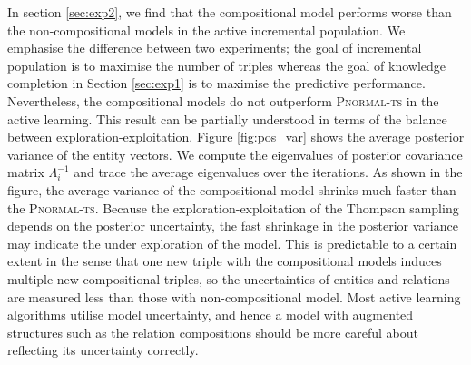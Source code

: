 In section \ref{sec:exp2}, we find that the compositional model performs worse than the non-compositional models in the active incremental population. 
We emphasise the difference between two experiments;
the goal of incremental population is to maximise the number of triples
whereas the goal of knowledge completion in Section \ref{sec:exp1} is to maximise
the predictive performance. Nevertheless, the compositional models do not outperform
\textsc{Pnormal-ts} in the active learning.
This result can be partially understood in terms of the balance between
exploration-exploitation. Figure \ref{fig:pos_var} shows the average posterior variance of
the entity vectors. We compute the eigenvalues of posterior covariance matrix $\Lambda_i^{-1}$
and trace the average eigenvalues over the iterations.
As shown in the figure, the average variance of the compositional model shrinks much faster
than the \textsc{Pnormal-ts}. Because the exploration-exploitation of the Thompson sampling depends on the
posterior uncertainty, the fast shrinkage in the posterior variance may indicate the under
exploration of the model. This is predictable to a certain extent in the sense that one new triple with the compositional models induces multiple new
compositional triples, so the uncertainties of entities and
relations are measured less than those with non-compositional model. Most active
learning algorithms utilise model uncertainty, and hence a model with augmented
structures such as the relation compositions should be more careful about reflecting its uncertainty correctly.
